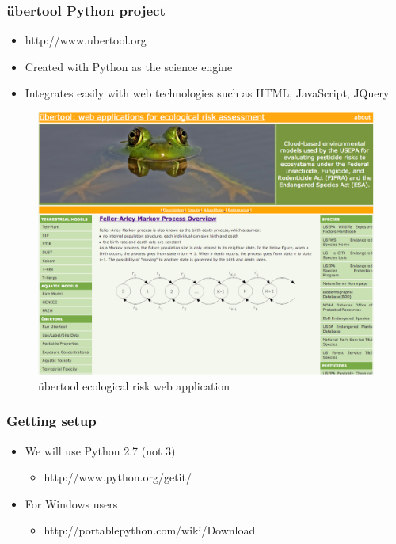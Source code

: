 \documentclass{beamer}
\begin{document}
\begin{frame}[fragile]
\frametitle{\"{u}bertool Python project}
\begin{itemize}
  \item{http://www.ubertool.org}
  \item{Created with Python as the science engine}
  \item{Integrates easily with web technologies such as HTML, JavaScript, JQuery}
\end{itemize} 
\begin{figure}
 \includegraphics[scale=0.18]{ubertool.png} 
 \caption{\"{u}bertool ecological risk web application}
\end{figure}
\end{frame}

\begin{frame}[fragile]
\frametitle{Getting setup}
\begin{itemize}
  \item{We will use Python 2.7 (not 3)}
  \begin{itemize}
  \item http://www.python.org/getit/
  \end{itemize}
  \item{For Windows users} 
  \begin{itemize}
  \item http://portablepython.com/wiki/Download
   \end{itemize}
\end{itemize} 
\end{frame}
\end{document}
